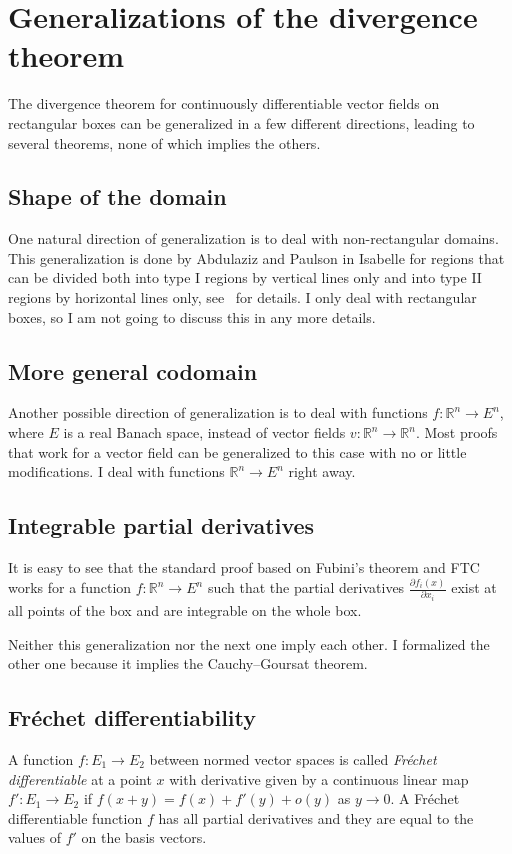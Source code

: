 \documentclass[a4paper,UKenglish,cleveref, autoref, thm-restate]{lipics-v2021}
\newcommand{\bbR}{\mathbb{R}}
\begin{document}
\section{Generalizations of the divergence theorem}%
\label{sec:gener-diverg-theor}

The divergence theorem for continuously differentiable vector fields
on rectangular boxes can be generalized in a few different directions,
leading to several theorems, none of which implies the others.

\subsection{Shape of the domain}
One natural direction of generalization is to deal with
non-rectangular domains. This generalization is done by Abdulaziz and
Paulson in Isabelle for regions that can be divided both into type I
regions by vertical lines only and into type II regions by horizontal
lines only, see~\cite{Abdulaziz_Paulson} for details. I only deal with
rectangular boxes, so I am not going to discuss this in any more
details.


\subsection{More general codomain}
Another possible direction of generalization is to deal with functions
\(f\colon \bbR^{n}\to E^{n}\), where \(E\) is a real Banach space,
instead of vector fields \(v\colon \bbR^{n}\to\bbR^{n}\).  Most proofs
that work for a vector field can be generalized to this case with no
or little modifications. I deal with functions \(\bbR^{n}\to E^{n}\)
right away.

\subsection{Integrable partial derivatives}
It is easy to see that the standard proof based on Fubini's theorem and
FTC works for a function \(f\colon \bbR^{n}\to E^{n}\) such that the
partial derivatives \(\frac{\partial f_{i}(x)}{\partial x_{i}}\) exist
at all points of the box and are integrable on the whole box.

Neither this generalization nor the next one imply each other. I
formalized the other one because it implies the Cauchy--Goursat theorem.

\subsection{Fréchet differentiability}
A function \(f\colon E_{1}\to E_{2}\) between normed vector spaces is
called \emph{Fréchet differentiable} at a point \(x\) with derivative
given by a continuous linear map \(f'\colon E_{1}\to E_{2}\) if
\(f(x+y)=f(x)+f'(y)+o(y)\) as \(y\to 0\). A Fréchet differentiable
function \(f\) has all partial derivatives and they are equal to the
values of \(f'\) on the basis vectors.
\end{document}
